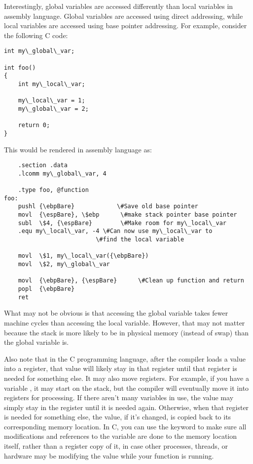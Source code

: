Interestingly, global variables are accessed differently than local variables
in assembly language.  Global variables are accessed using direct addressing,
while local variables are accessed using base pointer addressing.  For
example, consider the following C code:

\begin{simpletyping}
\begin{lstlisting}
int my\_global\_var;

int foo()
{
	int my\_local\_var;

	my\_local\_var = 1;
	my\_global\_var = 2;

	return 0;
}
\end{lstlisting}
\end{simpletyping}

This would be rendered in assembly language as:

\begin{simpletyping}
\begin{lstlisting}
	.section .data
	.lcomm my\_global\_var, 4

	.type foo, @function
foo:
	pushl {\ebpBare}            \#Save old base pointer
	movl  {\espBare}, \$ebp      \#make stack pointer base pointer
	subl  \$4, {\espBare}        \#Make room for my\_local\_var
	.equ my\_local\_var, -4 \#Can now use my\_local\_var to 
	                      \#find the local variable

	movl  \$1, my\_local\_var({\ebpBare})
	movl  \$2, my\_global\_var

	movl  {\ebpBare}, {\espBare}      \#Clean up function and return
	popl  {\ebpBare}
	ret
\end{lstlisting}
\end{simpletyping}

What may not be obvious is that accessing the global variable takes fewer
machine cycles than accessing the local variable.  However, that may not
matter because the stack is more likely to be in physical memory (instead of swap)
than the global variable is.

Also note that in the C programming language, after the compiler loads a value into a register, that value will likely
stay in that register until that register is needed for something else.  It
may also move registers.  For example, if you have a variable 
, it may start on the stack, but the compiler will
eventually move it into registers for processing.  If there aren't many
variables in use, the value may simply stay in the register until it is
needed again.  Otherwise, when that register is needed for something else,
the value, if it's changed, is copied back to its corresponding memory 
location.  In C, you can use the keyword  to
make sure all modifications and references to the variable are done to
the memory location itself, rather than a register copy of it, in case
other processes, threads, or hardware may be modifying the value while
your function is running.

